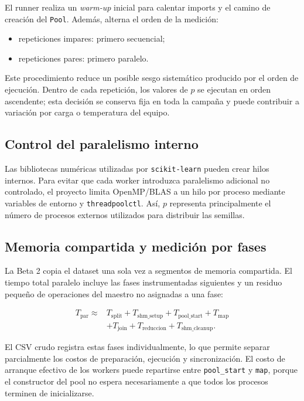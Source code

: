 \documentclass[11pt,a4paper]{article}
\begin{document}
El runner realiza un \emph{warm-up} inicial para calentar imports y el camino de
creación del \texttt{Pool}. Además, alterna el orden de la medición:

\begin{itemize}[leftmargin=*]
    \item repeticiones impares: primero secuencial;
    \item repeticiones pares: primero paralelo.
\end{itemize}

Este procedimiento reduce un posible sesgo sistemático producido por el orden de
ejecución. Dentro de cada repetición, los valores de $p$ se ejecutan en orden
ascendente; esta decisión se conserva fija en toda la campaña y puede contribuir
a variación por carga o temperatura del equipo.

\subsection{Control del paralelismo interno}

Las bibliotecas numéricas utilizadas por \texttt{scikit-learn} pueden crear hilos
internos. Para evitar que cada worker introduzca paralelismo adicional no controlado,
el proyecto limita OpenMP/BLAS a un hilo por proceso mediante variables de entorno y
\texttt{threadpoolctl}. Así, $p$ representa principalmente el número de procesos
externos utilizados para distribuir las semillas.

\subsection{Memoria compartida y medición por fases}

La Beta 2 copia el dataset una sola vez a segmentos de memoria compartida. El tiempo
total paralelo incluye las fases instrumentadas siguientes y un residuo pequeño
de operaciones del maestro no asignadas a una fase:

\begin{equation}
\begin{split}
T_{\mathrm{par}}\approx{}&
T_{\mathrm{split}}+
T_{\mathrm{shm\_setup}}+
T_{\mathrm{pool\_start}}+
T_{\mathrm{map}}\\
&+
T_{\mathrm{join}}+
T_{\mathrm{reduccion}}+
T_{\mathrm{shm\_cleanup}}.
\end{split}
\end{equation}

El CSV crudo registra estas fases individualmente, lo que permite separar parcialmente
los costos de preparación, ejecución y sincronización. El costo de arranque efectivo
de los workers puede repartirse entre \texttt{pool\_start} y \texttt{map}, porque
el constructor del pool no espera necesariamente a que todos los procesos terminen
de inicializarse.
\end{document}
